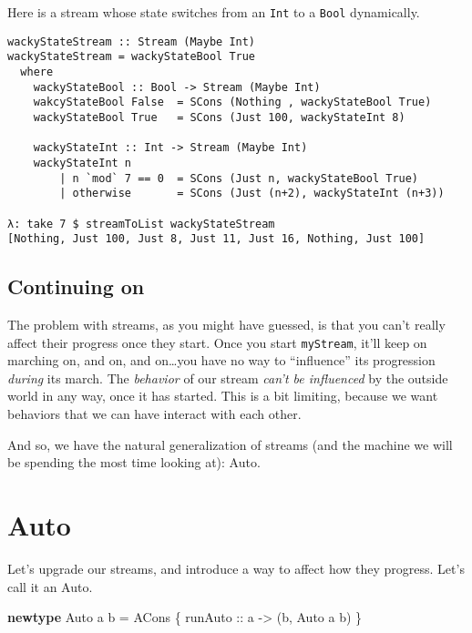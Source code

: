 \documentclass[]{article}
\newenvironment{Shaded}{}{}
\newcommand{\KeywordTok}[1]{\textcolor[rgb]{0.00,0.44,0.13}{\textbf{{#1}}}}
\newcommand{\DataTypeTok}[1]{\textcolor[rgb]{0.56,0.13,0.00}{{#1}}}
\newcommand{\OtherTok}[1]{\textcolor[rgb]{0.00,0.44,0.13}{{#1}}}
\newcommand{\FunctionTok}[1]{\textcolor[rgb]{0.02,0.16,0.49}{{#1}}}
\newcommand{\NormalTok}[1]{{#1}}
\begin{document}
Here is a stream whose state switches from an \texttt{Int} to a \texttt{Bool} dynamically.

\begin{verbatim}
wackyStateStream :: Stream (Maybe Int)
wackyStateStream = wackyStateBool True
  where
    wackyStateBool :: Bool -> Stream (Maybe Int)
    wakcyStateBool False  = SCons (Nothing , wackyStateBool True)
    wackyStateBool True   = SCons (Just 100, wackyStateInt 8)

    wackyStateInt :: Int -> Stream (Maybe Int)
    wackyStateInt n
        | n `mod` 7 == 0  = SCons (Just n, wackyStateBool True)
        | otherwise       = SCons (Just (n+2), wackyStateInt (n+3))

λ: take 7 $ streamToList wackyStateStream
[Nothing, Just 100, Just 8, Just 11, Just 16, Nothing, Just 100]
\end{verbatim}

\subsection{Continuing on}\label{continuing-on}

The problem with streams, as you might have guessed, is that you can't really affect their progress
once they start. Once you start \texttt{myStream}, it'll keep on marching on, and on, and
on\ldots{}you have no way to ``influence'' its progression \emph{during} its march. The
\emph{behavior} of our stream \emph{can't be influenced} by the outside world in any way, once it
has started. This is a bit limiting, because we want behaviors that we can have interact with each
other.

And so, we have the natural generalization of streams (and the machine we will be spending the most
time looking at): Auto.

\section{Auto}\label{auto}

Let's upgrade our streams, and introduce a way to affect how they progress. Let's call it an Auto.

\begin{Shaded}
\begin{Highlighting}[]
\KeywordTok{newtype} \DataTypeTok{Auto} \NormalTok{a b }\FunctionTok{=} \DataTypeTok{ACons} \NormalTok{\{}\OtherTok{ runAuto ::} \NormalTok{a }\OtherTok{->} \NormalTok{(b, }\DataTypeTok{Auto} \NormalTok{a b) \}}
\end{Highlighting}
\end{Shaded}
\end{document}

